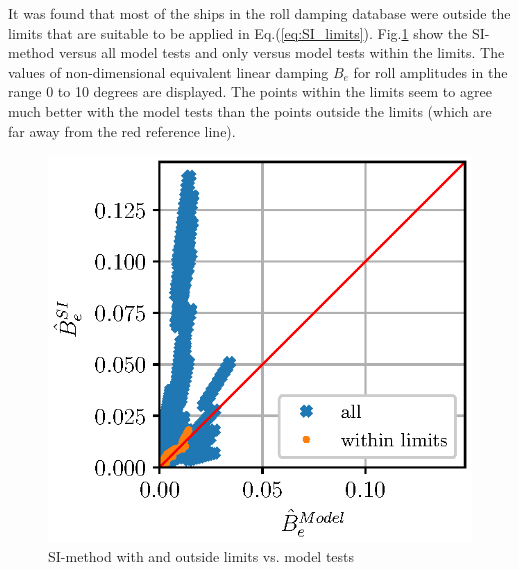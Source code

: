 It was found that most of the ships in the roll damping database were outside the limits that are suitable to be applied in Eq.(\ref{eq:SI_limits}). Fig.\ref{fig:si_model_within} show the SI-method versus all model tests and only versus model tests within the limits. The values of non-dimensional equivalent linear damping $B_e$ for roll amplitudes in the range 0 to 10 degrees are displayed. The points within the limits seem to agree much better with the model tests than the points outside the limits (which are far away from the red reference line). 

\begin{figure}[H]
\centering
  \centering
  \includegraphics[]{figures/si_model_within.eps}
  \vspace{-0.5cm}
  \caption{SI-method with and outside limits vs. model tests}
  \label{fig:si_model_within}
\end{figure}


